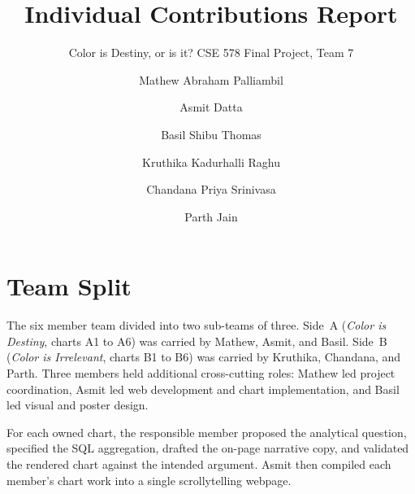 \documentclass[sigconf,nonacm,natbib=false]{acmart}
\begin{document}
\title{Individual Contributions Report}
\subtitle{Color is Destiny, or is it? CSE 578 Final Project, Team 7}

\author{Mathew Abraham Palliambil}

\author{Asmit Datta}

\author{Basil Shibu Thomas}

\author{Kruthika Kadurhalli Raghu}

\author{Chandana Priya Srinivasa}

\author{Parth Jain}

\renewcommand{\shortauthors}{Team 7}

\maketitle

\section{Team Split}

The six member team divided into two sub-teams of three. Side~A
(\emph{Color is Destiny}, charts A1 to A6) was carried by Mathew,
Asmit, and Basil. Side~B (\emph{Color is Irrelevant}, charts B1 to
B6) was carried by Kruthika, Chandana, and Parth. Three members
held additional cross-cutting roles: Mathew led project
coordination, Asmit led web development and chart implementation,
and Basil led visual and poster design.

For each owned chart, the responsible member proposed the
analytical question, specified the SQL aggregation, drafted the
on-page narrative copy, and validated the rendered chart against
the intended argument. Asmit then compiled each member's chart
work into a single scrollytelling webpage.
\end{document}
